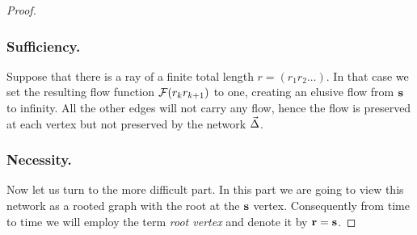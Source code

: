 \documentclass[12pt]{amsart}
\begin{document}
\begin{proof}
      \subsubsection*{Sufficiency.}
      Suppose that there is a ray of a finite total length $r=(r_1 r_2 \dots)$.
      In that case we set the resulting flow function $\mathcal{F}(r_k r_{k+1})$ to one, creating an elusive flow
        from $\mathbf{s}$ to infinity. All the other edges will not carry any flow, hence the flow is preserved
        at each vertex but not preserved by the network $\vec{\Delta}$.
      \subsubsection*{Necessity.}
      Now let us turn to the more difficult part.
      In this part we are going to view this network as a rooted graph with the root at the $\mathbf{s}$ vertex.
      Consequently from time to time we will employ the term \emph{root vertex} and denote it by $\mathbf{r} = \mathbf{s}$.


\end{proof}
\end{document}
